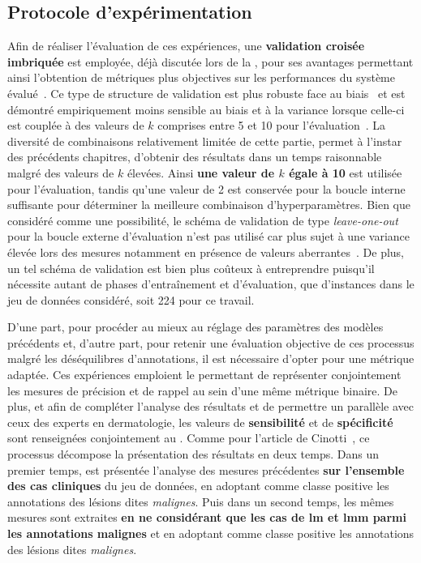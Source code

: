\subsection{Protocole d'expérimentation}
Afin de réaliser l'évaluation de ces expériences, une \textbf{validation croisée imbriquée} est employée, déjà discutée lors de la , pour ses avantages permettant ainsi l'obtention de métriques plus objectives sur les performances du système évalué~\cite{Cawley2010}. Ce type de structure de validation est plus robuste face au biais~\cite{Cawley2010} et est démontré empiriquement moins sensible au biais et à la variance lorsque celle-ci est couplée à des valeurs de $k$ comprises entre 5 et 10 pour l'évaluation~\cite{James2013}. La diversité de combinaisons relativement limitée de cette partie, permet à l'instar des précédents chapitres, d'obtenir des résultats dans un temps raisonnable malgré des valeurs de $k$ élevées. Ainsi \textbf{une valeur de $k$ égale à 10} est utilisée pour l'évaluation, tandis qu'une valeur de 2 est conservée pour la boucle interne suffisante pour déterminer la meilleure combinaison d'hyperparamètres. Bien que considéré comme une possibilité, le schéma de validation de type \textit{leave-one-out} pour la boucle externe d'évaluation n'est pas utilisé car plus sujet à une variance élevée lors des mesures notamment en présence de valeurs aberrantes~\cite{Bengio2004}. De plus, un tel schéma de validation est bien plus coûteux à entreprendre puisqu'il nécessite autant de phases d'entraînement et d'évaluation, que d'instances dans le jeu de données considéré, soit 224 pour ce travail.\par

D'une part, pour procéder au mieux au réglage des paramètres des modèles précédents et, d'autre part, pour retenir une évaluation objective de ces processus malgré les déséquilibres d'annotations, il est nécessaire d'opter pour une métrique adaptée. Ces expériences emploient le \textbf{\fscore{}} permettant de représenter conjointement les mesures de précision et de rappel au sein d'une même métrique binaire. De plus, et afin de compléter l'analyse des résultats et de permettre un parallèle avec ceux des experts en dermatologie, les valeurs de \textbf{sensibilité} et de \textbf{spécificité} sont renseignées conjointement au \fscore{}. Comme pour l'article de Cinotti~, ce processus décompose la présentation des résultats en deux temps. Dans un premier temps, est présentée l'analyse des mesures précédentes \textbf{sur l'ensemble des cas cliniques} du jeu de données, en adoptant comme classe positive les annotations des lésions dites \textit{malignes}. Puis dans un second temps, les mêmes mesures sont extraites \textbf{en ne considérant que les cas de \textbf{\gls{lm} et \gls{lmm}} parmi les annotations malignes} et en adoptant comme classe positive les annotations des lésions dites \textit{malignes}.\par

